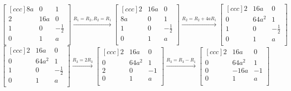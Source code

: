 \documentclass[11pt]{article}
\begin{document}
\begin{equation*}
  \begin{bmatrix}[ccc]
    8a & 0   & 1 \\
    2  & 16a & 0 \\
    1  & 0   & -\frac{1}{2} \\
    0  & 1   & a \\
  \end{bmatrix}
  \xrightarrow{R_1 = R_2, R_2 = R_1}
  \begin{bmatrix}[ccc]
    2  & 16a & 0 \\
    8a & 0   & 1 \\
    1  & 0   & -\frac{1}{2} \\
    0  & 1   & a \\
  \end{bmatrix}
  \xrightarrow{R_2 = R_2 + 4aR_1}
  \begin{bmatrix}[ccc]
    2 & 16a   & 0 \\
    0 & 64a^2 & 1 \\
    1 & 0     & -\frac{1}{2} \\
    0 & 1     & a \\
  \end{bmatrix}
\end{equation*}
\begin{equation*}
  \begin{bmatrix}[ccc]
    2 & 16a   & 0 \\
    0 & 64a^2 & 1 \\
    1 & 0     & -\frac{1}{2} \\
    0 & 1     & a \\
  \end{bmatrix}
  \xrightarrow{R_3 = 2R_3}
  \begin{bmatrix}[ccc]
    2 & 16a   & 0 \\
    0 & 64a^2 & 1 \\
    2 & 0     & -1 \\
    0 & 1     & a \\
  \end{bmatrix}
  \xrightarrow{R_3 = R_3 - R_1}
  \begin{bmatrix}[ccc]
    2 & 16a   & 0 \\
    0 & 64a^2 & 1 \\
    0 & -16a  & -1 \\
    0 & 1     & a \\
  \end{bmatrix}
\end{equation*}
\end{document}
